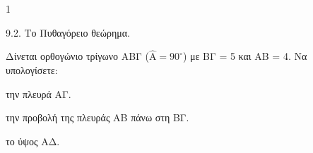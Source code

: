 \begin{ylh}{1}
    \item 9.2. Το Πυθαγόρειο θεώρημα.
\end{ylh}
\begin{figure} %
\end{figure}
Δίνεται ορθογώνιο τρίγωνο ΑΒΓ ($\hat{\text{A}} = 90^\circ$) με ΒΓ = 5 και ΑΒ = 4. Να υπολογίσετε:
\begin{alist}
    \item την πλευρά ΑΓ. 
    \item την προβολή της πλευράς ΑΒ πάνω στη ΒΓ. 
    \item το ύψος ΑΔ. 
\end{alist}